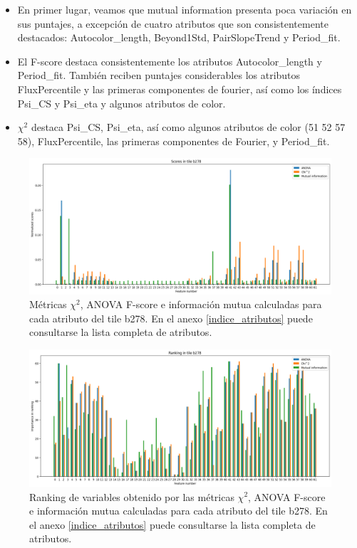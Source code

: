 \begin{itemize}
\item En primer lugar, veamos que mutual information presenta poca variación en sus puntajes, a excepción de cuatro atributos que son consistentemente destacados: Autocolor\_length, Beyond1Std, PairSlopeTrend y Period\_fit.
\item El F-score destaca consistentemente los atributos Autocolor\_length y Period\_fit. También reciben puntajes considerables los atributos FluxPercentile y las primeras componentes de fourier, así como los índices Psi\_CS y Psi\_eta y algunos atributos de color.
\item $\chi^2$ destaca Psi\_CS, Psi\_eta, así como algunos atributos de color (51 52 57 58), FluxPercentile, las primeras componentes de Fourier, y Period\_fit.
\end{itemize}


\begin{figure}[h!]
\centering
  \includegraphics[width=1\textwidth]{Kap6/test=b278_variable_importance_scores}
\caption{ Métricas $\chi^2$, ANOVA F-score e información mutua calculadas para cada atributo del tile b278. En el anexo \protect\ref{indice_atributos} puede consultarse la lista completa de atributos. }
\label{fig:scores_b278}
\end{figure}

\begin{figure}[h!]
\centering
  \includegraphics[width=1\textwidth]{Kap6/test=b278_variable_importance_ranking}
\caption{ Ranking de variables obtenido por las métricas $\chi^2$, ANOVA F-score e información mutua calculadas para cada atributo del tile b278. En el anexo \protect\ref{indice_atributos} puede consultarse la lista completa de atributos. }
\label{fig:ranking_b278}
\end{figure}

